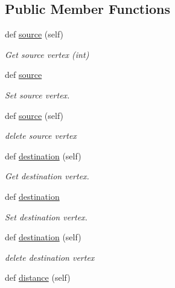 \subsection*{Public Member Functions}
\begin{DoxyCompactItemize}
\item 
def \hyperlink{classbridges_1_1data__src__dependent_1_1osm_1_1_osm_edge_a52c735a9496d74764fbcf29805d4f372}{source} (self)
\begin{DoxyCompactList}\small\item\em Get source vertex (int) \end{DoxyCompactList}\item 
def \hyperlink{classbridges_1_1data__src__dependent_1_1osm_1_1_osm_edge_a7e91ba375c45e21b3364f84d3415384d}{source}
\begin{DoxyCompactList}\small\item\em Set source vertex. \end{DoxyCompactList}\item 
def \hyperlink{classbridges_1_1data__src__dependent_1_1osm_1_1_osm_edge_a52c735a9496d74764fbcf29805d4f372}{source} (self)
\begin{DoxyCompactList}\small\item\em delete source vertex \end{DoxyCompactList}\item 
def \hyperlink{classbridges_1_1data__src__dependent_1_1osm_1_1_osm_edge_ac3e5f99dd826c60fba46a5db69ee4b12}{destination} (self)
\begin{DoxyCompactList}\small\item\em Get destination vertex. \end{DoxyCompactList}\item 
def \hyperlink{classbridges_1_1data__src__dependent_1_1osm_1_1_osm_edge_a985f37861dec03b102c0230259a27e50}{destination}
\begin{DoxyCompactList}\small\item\em Set destination vertex. \end{DoxyCompactList}\item 
def \hyperlink{classbridges_1_1data__src__dependent_1_1osm_1_1_osm_edge_ac3e5f99dd826c60fba46a5db69ee4b12}{destination} (self)
\begin{DoxyCompactList}\small\item\em delete destination vertex \end{DoxyCompactList}\item 
def \hyperlink{classbridges_1_1data__src__dependent_1_1osm_1_1_osm_edge_ae20fb44608780d4f10f55c1a85e4d410}{distance} (self)

\end{DoxyCompactItemize}
